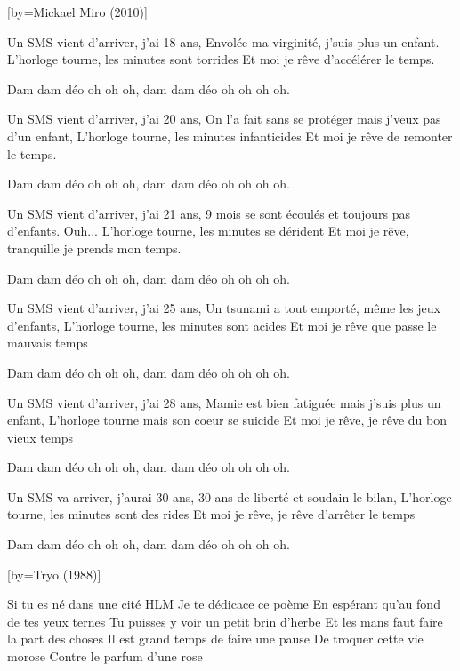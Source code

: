 [by={Mickael Miro (2010)}]

\beginverse
Un SMS vient d’arriver, j’ai 18 ans,
Envolée ma virginité, j'suis plus un enfant.
L’horloge tourne, les minutes sont torrides
Et moi je rêve d’accélérer le temps.
\endverse

\beginverse
Dam dam déo oh oh oh, dam dam déo oh oh oh oh.
\endverse

\beginverse
Un SMS vient d’arriver, j’ai 20 ans,
On l’a fait sans se protéger mais j'veux pas d’un enfant,
L’horloge tourne, les minutes infanticides
Et moi je rêve de remonter le temps.
\endverse

\beginverse
Dam dam déo oh oh oh, dam dam déo oh oh oh oh.
\endverse

\beginverse
Un SMS vient d’arriver, j’ai 21 ans,
9 mois se sont écoulés et toujours pas d’enfants. Ouh...
L’horloge tourne, les minutes se dérident
Et moi je rêve, tranquille je prends mon temps.
\endverse

\beginverse
Dam dam déo oh oh oh, dam dam déo oh oh oh oh.
\endverse

\beginverse
Un SMS vient d’arriver, j’ai 25 ans,
Un tsunami a tout emporté, même les jeux d’enfants,
L’horloge tourne, les minutes sont acides
Et moi je rêve que passe le mauvais temps
\endverse

\beginverse
Dam dam déo oh oh oh, dam dam déo oh oh oh oh.
\endverse

\beginverse
Un SMS vient d’arriver, j’ai 28 ans,
Mamie est bien fatiguée mais j’suis plus un enfant,
L’horloge tourne mais son coeur se suicide
Et moi je rêve, je rêve du bon vieux temps
\endverse

\beginverse
Dam dam déo oh oh oh, dam dam déo oh oh oh oh. \\[bis]
\endverse

\beginverse
Un SMS va arriver, j’aurai 30 ans,
30 ans de liberté et soudain le bilan,
L’horloge tourne, les minutes sont des rides
Et moi je rêve, je rêve d’arrêter le temps
\endverse

\beginverse
Dam dam déo oh oh oh, dam dam déo oh oh oh oh. \\[3x]
\endverse

[by={Tryo (1988)}]

\beginverse
Si tu es né dans une cité HLM
Je te dédicace ce poème
En espérant qu'au fond de tes yeux ternes
Tu puisses y voir un petit brin d'herbe
Et les mans faut faire la part des choses
Il est grand temps de faire une pause
De troquer cette vie morose
Contre le parfum d'une rose
\endverse

